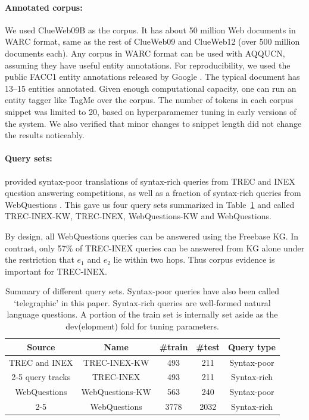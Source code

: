 \documentclass{svjour3}
\begin{document}
\paragraph{Annotated corpus:} We used ClueWeb09B \citep{ClueWeb09} as the corpus.  It has about 50 million Web documents in WARC format, same as the rest of ClueWeb09 and ClueWeb12 (over 500 million documents each).  Any corpus in WARC format can be used with AQQUCN, assuming they have useful entity annotations.  For reproducibility, we used the public FACC1 entity annotations released by Google \citep{Google2013FACC1}.  The typical document has 13--15 entities annotated.  Given enough computational capacity, one can run an entity tagger like TagMe \citep{FerraginaS2010TagMe} over the corpus.  The number of tokens in each corpus snippet was limited to 20, based on hyperparamemer tuning in early versions of the system.  We also verified that minor changes to snippet length did not change the results noticeably.

\paragraph{Query sets:}
\citet{JoshiSC2014KgCorpusJoint} provided syntax-poor translations \citep{CsawProject} of syntax-rich queries from TREC and INEX question answering competitions, as well as
a fraction of syntax-rich queries from WebQuestions \citep{BerantCFL2013SEMPRE}.  This gave us four query sets summarized in Table~\ref{fig:querysets} and called TREC-INEX-KW, TREC-INEX, WebQuestions-KW and WebQuestions.

By design, all WebQuestions queries can be answered using the Freebase KG.  In contrast, only 57\% of TREC-INEX queries can be answered from KG alone under the restriction that $e_1$ and $e_2$ lie within two hops.  Thus corpus evidence is important for TREC-INEX.

\begin{table}[t]
  \centering
  \begin{tabular}{|c | c | c | c | c|}
    \hline
    Source & Name & \#train & \#test & Query type\\
    \hline
    TREC and INEX& TREC-INEX-KW   & 493 & 211 & Syntax-poor \\
    \cline{2-5}
    query tracks & TREC-INEX  & 493 & 211 & Syntax-rich \\
    \hline
    WebQuestions& WebQuestions-KW   & 563 & 240 & Syntax-poor \\
    \cline{2-5}
    & WebQuestions  & 3778 & 2032 & Syntax-rich \\
    \hline
  \end {tabular}
\caption{Summary of different query sets.   Syntax-poor queries have also been called `telegraphic' in this paper.  Syntax-rich queries are well-formed natural language questions.  A portion of the train set is internally set aside as the dev(elopment) fold for tuning parameters.}   \label{fig:querysets}
\end{table}
\end{document}
